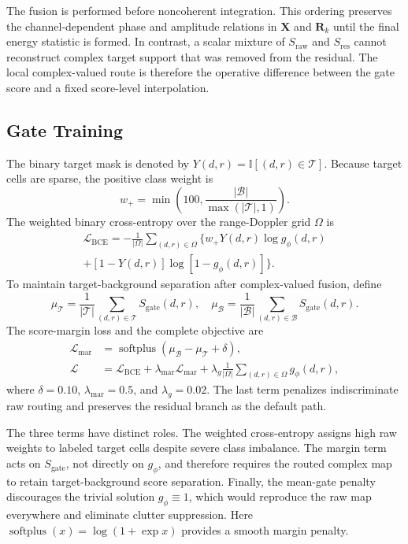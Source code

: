 \documentclass[journal]{IEEEtran}
\begin{document}
The fusion is performed before noncoherent integration. This ordering preserves the channel-dependent phase and amplitude relations in $\bm{X}$ and $\bm{R}_k$ until the final energy statistic is formed. In contrast, a scalar mixture of $S_{\mathrm{raw}}$ and $S_{\mathrm{res}}$ cannot reconstruct complex target support that was removed from the residual. The local complex-valued route is therefore the operative difference between the gate score and a fixed score-level interpolation.

\subsection{Gate Training}

The binary target mask is denoted by $Y(d,r)=\mathbb I[(d,r)\in\mathcal{T}]$. Because target cells are sparse, the positive class weight is
\begin{equation}
    w_{+}=\min\left(100,
    \frac{|\mathcal{B}|}{\max(|\mathcal{T}|,1)}\right).
\end{equation}
The weighted binary cross-entropy over the range-Doppler grid $\Omega$ is
\begin{multline}
    \mathcal{L}_{\mathrm{BCE}}=-\frac{1}{|\Omega|}
    \sum_{(d,r)\in\Omega}\bigl\{
    w_{+}Y(d,r)\log g_{\phi}(d,r) \\
    +[1-Y(d,r)]\log[1-g_{\phi}(d,r)]\bigr\}.
\end{multline}
To maintain target-background separation after complex-valued fusion, define
\begin{equation}
    \mu_{\mathcal{T}}=\frac{1}{|\mathcal{T}|}
    \sum_{(d,r)\in\mathcal{T}}S_{\mathrm{gate}}(d,r),
    \quad
    \mu_{\mathcal{B}}=\frac{1}{|\mathcal{B}|}
    \sum_{(d,r)\in\mathcal{B}}S_{\mathrm{gate}}(d,r).
\end{equation}
The score-margin loss and the complete objective are
\begin{align}
    \mathcal{L}_{\mathrm{mar}} & =
    \operatorname{softplus}(\mu_{\mathcal{B}}-\mu_{\mathcal{T}}+\delta), \\
    \mathcal{L} & = \mathcal{L}_{\mathrm{BCE}}
    +\lambda_{\mathrm{mar}}\mathcal{L}_{\mathrm{mar}}
    +\lambda_g\frac{1}{|\Omega|}\sum_{(d,r)\in\Omega}g_{\phi}(d,r),
\end{align}
where $\delta=0.10$, $\lambda_{\mathrm{mar}}=0.5$, and $\lambda_g=0.02$. The last term penalizes indiscriminate raw routing and preserves the residual branch as the default path.

The three terms have distinct roles. The weighted cross-entropy assigns high raw weights to labeled target cells despite severe class imbalance. The margin term acts on $S_{\mathrm{gate}}$, not directly on $g_{\phi}$, and therefore requires the routed complex map to retain target-background score separation. Finally, the mean-gate penalty discourages the trivial solution $g_{\phi}\equiv1$, which would reproduce the raw map everywhere and eliminate clutter suppression. Here $\operatorname{softplus}(x)=\log(1+\exp x)$ provides a smooth margin penalty.
\end{document}
